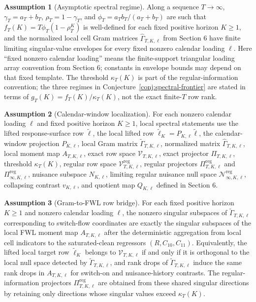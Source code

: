 \documentclass[11pt]{article}
\theoremstyle{definition}
\newtheorem{assumption}{Assumption}
\theoremstyle{plain}
\theoremstyle{remark}
\begin{document}
\begin{assumption}[Asymptotic spectral regime]\label{ass:spectral-regime}
Along a sequence \(T\to\infty\), \(\gamma_T=a_T+b_T\), \(\rho_T=1-\gamma_T\), and \(\phi_T=a_Tb_T/(a_T+b_T)\) are such that \(f_T(K)=T\phi_T(1-\rho_T^K)\) is well-defined for each fixed positive horizon \(K\ge1\), and the normalized local cell Gram matrices \(\widehat \Gamma_{T,K,\ell}\) from Section 6 have finite limiting singular-value envelopes for every fixed nonzero calendar loading \(\ell\).
Here ``fixed nonzero calendar loading'' means the finite-support triangular loading array convention from Section 6; constants in envelope bounds may depend on that fixed template.
The threshold \(\kappa_T(K)\) is part of the regular-information convention; the three regimes in Conjecture~\ref{conj:spectral-frontier} are stated in terms of \(g_T(K)=f_T(K)/\kappa_T(K)\), not the exact finite-\(T\) row rank.
\end{assumption}

\begin{assumption}[Calendar-window localization]\label{ass:calendar-window}
For each nonzero calendar loading \(\ell\) and fixed positive horizon \(K\ge1\), local spectral statements use the lifted response-surface row \(\widetilde\ell\), the local lifted row \(\widetilde\ell_K=P_{K,\ell}\widetilde\ell\), the calendar-window projection \(P_{K,\ell}\), local Gram matrix \(\widetilde \Gamma_{T,K,\ell}\), normalized matrix \(\widehat \Gamma_{T,K,\ell}\), local moment map \(A_{T,K,\ell}\), exact row space \(\mathcal V_{T,K,\ell}\), exact projector \(\Pi_{T,K,\ell}\), threshold \(\kappa_T(K)\), regular row space \(\mathcal V^{\mathrm{reg}}_{T,K,\ell}\), regular projectors \(\Pi^{\mathrm{reg}}_{T,K,\ell}\) and \(\Pi^{\mathrm{reg}}_{\infty,K,\ell}\), nuisance subspace \(N_{K,\ell}\), limiting regular nuisance null space \(\mathcal N^{\mathrm{reg}}_{\infty,K,\ell}\), collapsing contrast \(v_{K,\ell}\), and quotient map \(Q_{K,\ell}\) defined in Section 6.
\end{assumption}

\begin{assumption}[Gram-to-FWL row bridge]\label{ass:gram-fwl-bridge}
For each fixed positive horizon \(K\ge1\) and nonzero calendar loading \(\ell\), the nonzero singular subspaces of \(\widetilde \Gamma_{T,K,\ell}\) corresponding to switch-flow coordinates are exactly the singular subspaces of the local FWL moment map \(A_{T,K,\ell}\) after the deterministic aggregation from local cell indicators to the saturated-clean regressors \((R,C_{10},C_{11})\).
Equivalently, the lifted local target row \(\widetilde\ell_K\) belongs to \(\mathcal V_{T,K,\ell}\) if and only if it is orthogonal to the local null space detected by \(\widetilde \Gamma_{T,K,\ell}\), and rank drops of \(\widetilde \Gamma_{T,K,\ell}\) induce the same rank drops in \(A_{T,K,\ell}\) for switch-on and nuisance-history contrasts.
The regular-information projectors \(\Pi^{\mathrm{reg}}_{T,K,\ell}\) are obtained from these shared singular directions by retaining only directions whose singular values exceed \(\kappa_T(K)\).
\end{assumption}
\end{document}
